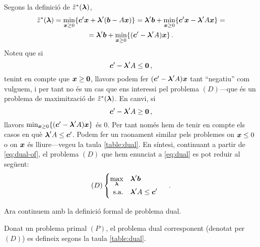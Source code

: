 Segons la definició de $\tilde{z}^\ast(\boldsymbol{\lambda})$,
%
\begin{equation}\label{eq:dual-of}
\begin{gathered}
	\tilde{z}^\ast(\boldsymbol{\lambda})
	= \min_{\boldsymbol{x}\ge 0} \{\boldsymbol{c}'\boldsymbol{x}+\boldsymbol{\lambda}'(\boldsymbol{b}-A\boldsymbol{x})\}
	= \boldsymbol{\lambda}'\boldsymbol{b}+ \min_{\boldsymbol{x}\ge0}\{\boldsymbol{c}'\boldsymbol{x}-\boldsymbol{\lambda}'A\boldsymbol{x}\}=\\
	=  \boldsymbol{\lambda}'\boldsymbol{b}+ \min_{\boldsymbol{x}\ge0}\{(\boldsymbol{c}'-\boldsymbol{\lambda}'A)\boldsymbol{x}\}\,.
\end{gathered}
\end{equation}
%
Noteu que si \[\boldsymbol{c}'-\boldsymbol{\lambda}'A \le \boldsymbol{0}\,,\] tenint en compte que $\boldsymbol{x}\ge\boldsymbol{0}$, llavors podem fer $(\boldsymbol{c}'-\boldsymbol{\lambda}'A)\boldsymbol{x}$ tant ``negatiu'' com vulguem, i per tant no és un cas que ens interessi pel problema $(D)$---que és un problema de maximització de $\tilde{z}^\ast(\boldsymbol{\lambda})$. En canvi, si \[\boldsymbol{c}'-\boldsymbol{\lambda}'A \ge \boldsymbol{0}\,,\] llavors $\min_{\boldsymbol{x}\ge0}\{(\boldsymbol{c}'-\boldsymbol{\lambda}'A)\boldsymbol{x}\}$ és 0. Per tant només hem de tenir en compte els casos en què $\boldsymbol{\lambda}'A \le \boldsymbol{c}'$.  Podem fer un raonament similar pels problemes on $\boldsymbol{x}\le 0$ o on $\boldsymbol{x}$ és lliure---vegeu la taula \ref{table:dual}. En síntesi, continuant a partir de \eqref{eq:dual-of}, el problema $(D)$ que hem enunciat a \eqref{eq:dual} es pot reduir al següent:
\[
	(D)
	\begin{cases}
	\begin{aligned}
		\max_{\boldsymbol{\lambda}}		&&& \boldsymbol{\lambda}'\boldsymbol{b}\\
		\text{s.a.}				&&& \boldsymbol{\lambda}'A \le \boldsymbol{c}'\\
	\end{aligned}
	\end{cases}\ .
\]

Ara continuem amb la definició formal de problema dual.

\begin{defi}
	Donat un problema primal $(P)$, el problema dual corresponent (denotat per $(D)$) es defineix segons la taula \ref{table:dual}.
\end{defi}


